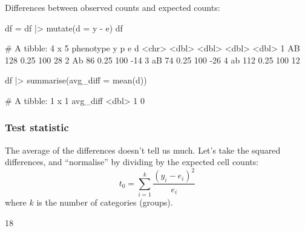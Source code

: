 \documentclass[a4paper]{article}
\begin{document}
Differences between observed counts and expected counts:
\begin{Schunk}
\begin{Sinput}
df = df |>
  mutate(d = y - e)
df
\end{Sinput}
\begin{Soutput}
# A tibble: 4 x 5
  phenotype     y     p     e     d
  <chr>     <dbl> <dbl> <dbl> <dbl>
1 AB          128  0.25   100    28
2 Ab           86  0.25   100   -14
3 aB           74  0.25   100   -26
4 ab          112  0.25   100    12
\end{Soutput}
\begin{Sinput}
df |>
	summarise(avg_diff = mean(d))
\end{Sinput}
\begin{Soutput}
# A tibble: 1 x 1
  avg_diff
     <dbl>
1        0
\end{Soutput}
\end{Schunk}
\subsubsection{Test statistic}
The average of the differences doesn't tell us much. Let's take the squared differences, and ``normalise'' by dividing by the expected cell counts:
\[
	t_0 = \sum_{i=1}^{k} \frac{(y_i - e_i)^2}{e_i}
\]
where \( k \) is the number of categories (groups).
\begin{Schunk}
\begin{Soutput}
[1] 18
\end{Soutput}
\end{Schunk}
\end{document}
